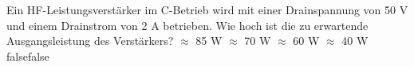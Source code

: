     {Ein HF-Leistungsverstärker im C-Betrieb wird mit einer Drainspannung von 50 V und einem Drainstrom von 2 A betrieben. Wie hoch ist die zu erwartende Ausgangsleistung des Verstärkers?}
    {$\approx$ 85 W}
    {$\approx$ 70 W}
    {$\approx$ 60 W}
    {$\approx$ 40 W}
    {false}{false}